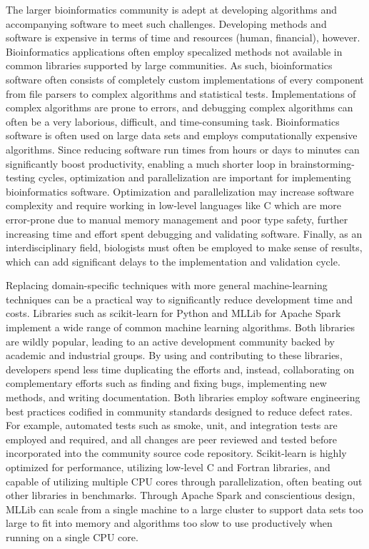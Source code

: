 The larger bioinformatics community is adept at developing algorithms and accompanying software to meet such challenges.  Developing methods and software is expensive in terms of time and resources (human, financial), however.  Bioinformatics applications often employ specalized methods not available in common libraries supported by large communities.  As such, bioinformatics software often consists of completely custom implementations of every component from file parsers to complex algorithms and statistical tests.  Implementations of complex algorithms are prone to errors, and debugging complex algorithms can often be a very laborious, difficult, and time-consuming task.  Bioinformatics software is often used on large data sets and employs computationally expensive algorithms.  Since reducing software run times from hours or days to minutes can significantly boost productivity, enabling a much shorter loop in brainstorming-testing cycles, optimization and parallelization are important for implementing bioinformatics software.  Optimization and parallelization may increase software complexity and require working in low-level languages like C which are more error-prone due to manual memory management and poor type safety, further increasing time and effort spent debugging and validating software. Finally, as an interdisciplinary field, biologists must often be employed to make sense of results, which can add significant delays to the implementation and validation cycle.

Replacing domain-specific techniques with more general machine-learning techniques can be a practical way to significantly reduce development time and costs. Libraries such as scikit-learn \cite{scikit-learn} for Python and MLLib for Apache Spark implement a wide range of common machine learning algorithms.  Both libraries are wildly popular, leading to an active development community backed by academic and industrial groups.  By using and contributing to these libraries, developers spend less time duplicating the efforts and, instead, collaborating on complementary efforts such as finding and fixing bugs, implementing new methods, and writing documentation.  Both libraries employ software engineering best practices codified in community standards designed to reduce defect rates.  For example, automated tests such as smoke, unit, and integration tests are employed and required, and all changes are peer reviewed and tested before incorporated into the community source code repository.  Scikit-learn is highly optimized for performance, utilizing low-level C and Fortran libraries, and capable of utilizing multiple CPU cores through parallelization, often beating out other libraries in benchmarks.  Through Apache Spark and conscientious design, MLLib can scale from a single machine to a large cluster to support data sets too large to fit into memory and algorithms too slow to use productively when running on a single CPU core.

